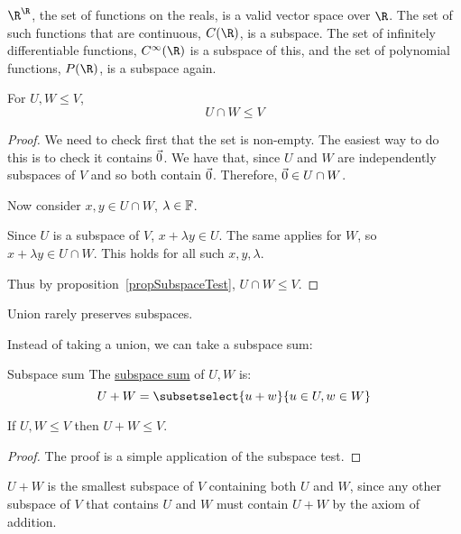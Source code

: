 \documentclass[../Main.tex]{subfiles}
\begin{document}
\begin{example}
    $\R^{\R}$, the set of functions on the reals, is a valid vector space over $\R$. The set of such functions that are continuous, $C(\R)$, is a subspace.
    The set of infinitely differentiable functions, $C^{\infty}(\R)$ is a subspace of this, and the set of polynomial functions, $P(\R)$, is a subspace again.
\end{example}
\begin{lemma}
    For $U, W \leq V$,
    \begin{equation*}
        U \cap W \leq V
    \end{equation*}
    \label{lemIntersectSubspace}
\end{lemma}
\begin{proof}
    We need to check first that the set is non-empty. The easiest way to do this is to check it contains $\vec{0}$. We have that, since $U$ and $W$ are independently subspaces of $V$ and so both contain $\vec{0}$. Therefore, $\vec{0} \in  U \cap W$.

    Now consider $x, y \in U \cap W$, $\lambda \in \mathbb{F}$.

    Since $U$ is a subspace of $V$, $x + \lambda y \in U$. The same applies for $W$, so $x + \lambda y \in U \cap W$. This holds for all such $x, y, \lambda$.

    Thus by proposition~\ref{propSubspaceTest}, $U \cap W \leq V$.
\end{proof}
\begin{warning}
    Union rarely preserves subspaces.
\end{warning}
Instead of taking a union, we can take a subspace sum:
\begin{definition}{Subspace sum}
    The \underline{subspace sum} of $U, W$ is:
    \begin{equation*}
        U + W = \subsetselect{u + w}{u \in U, w \in W}
    \end{equation*}
\end{definition}
\begin{lemma}
    If $U, W \leq V$ then $U + W \leq V$.
    \label{lemSubspaceSum}
\end{lemma}
\begin{proof}
    The proof is a simple application of the subspace test.
\end{proof}
\begin{remark}
    $U + W$ is the smallest subspace of $V$ containing both $U$ and $W$, since any other subspace of $V$ that contains $U$ and $W$ must contain $U + W$ by the axiom of addition.
\end{remark}
\end{document}
